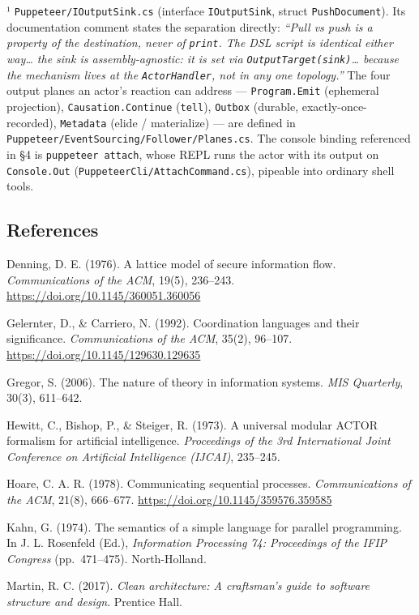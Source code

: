\documentclass[
]{article}
\begin{document}
¹ \texttt{Puppeteer/IOutputSink.cs} (interface \texttt{IOutputSink},
struct \texttt{PushDocument}). Its documentation comment states the
separation directly: \emph{``Pull vs push is a property of the
destination, never of \texttt{print}. The DSL script is identical either
way\ldots{} the sink is assembly-agnostic: it is set via
\texttt{OutputTarget(sink)}\ldots{} because the mechanism lives at the
\texttt{ActorHandler}, not in any one topology.''} The four output
planes an actor's reaction can address --- \texttt{Program.Emit}
(ephemeral projection), \texttt{Causation.Continue} (\texttt{tell}),
\texttt{Outbox} (durable, exactly-once-recorded), \texttt{Metadata}
(elide / materialize) --- are defined in
\texttt{Puppeteer/EventSourcing/Follower/Planes.cs}. The console binding
referenced in §4 is \texttt{puppeteer\ attach}, whose REPL runs the
actor with its output on \texttt{Console.Out}
(\texttt{PuppeteerCli/AttachCommand.cs}), pipeable into ordinary shell
tools.

\subsection{References}\label{references}

Denning, D. E. (1976). A lattice model of secure information flow.
\emph{Communications of the ACM}, 19(5), 236--243.
\url{https://doi.org/10.1145/360051.360056}

Gelernter, D., \& Carriero, N. (1992). Coordination languages and their
significance. \emph{Communications of the ACM}, 35(2), 96--107.
\url{https://doi.org/10.1145/129630.129635}

Gregor, S. (2006). The nature of theory in information systems.
\emph{MIS Quarterly}, 30(3), 611--642.

Hewitt, C., Bishop, P., \& Steiger, R. (1973). A universal modular ACTOR
formalism for artificial intelligence. \emph{Proceedings of the 3rd
International Joint Conference on Artificial Intelligence (IJCAI)},
235--245.

Hoare, C. A. R. (1978). Communicating sequential processes.
\emph{Communications of the ACM}, 21(8), 666--677.
\url{https://doi.org/10.1145/359576.359585}

Kahn, G. (1974). The semantics of a simple language for parallel
programming. In J. L. Rosenfeld (Ed.), \emph{Information Processing 74:
Proceedings of the IFIP Congress} (pp.~471--475). North-Holland.

Martin, R. C. (2017). \emph{Clean architecture: A craftsman's guide to
software structure and design}. Prentice Hall.
\end{document}
